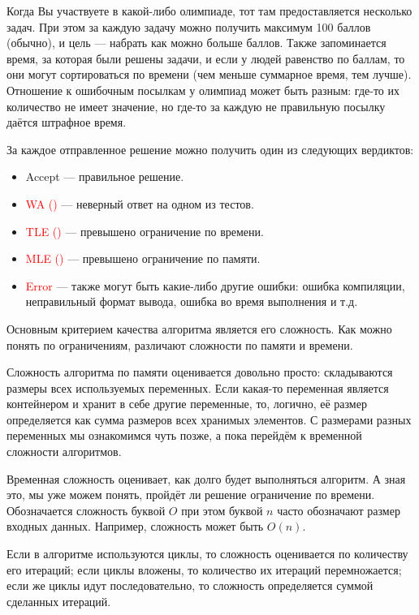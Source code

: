 Когда Вы участвуете в какой-либо олимпиаде, тот там предоставляется несколько задач. При этом за каждую задачу можно получить максимум 100 баллов (обычно), и цель — набрать как можно больше баллов. Также запоминается время, за которая были решены задачи, и если у людей равенство по баллам, то они могут сортироваться по времени (чем меньше суммарное время, тем лучше). Отношение к ошибочным посылкам у олимпиад может быть разным: где-то их количество не имеет значение, но где-то за каждую не правильную посылку даётся штрафное время.

За каждое отправленное решение можно получить один из следующих вердиктов:
\begin{itemize}
    \item \textcolor{dark_green}{Accept} — правильное решение.
    \item \textcolor{red}{WA ()} — неверный ответ на одном из тестов.
    \item \textcolor{red}{TLE ()} — превышено ограничение по времени.
    \item \textcolor{red}{MLE ()} — превышено ограничение по памяти.
    \item \textcolor{red}{Error} — также могут быть какие-либо другие ошибки: ошибка компиляции, неправильный формат вывода, ошибка во время выполнения и т.д.
\end{itemize}

Основным критерием качества алгоритма является его сложность. Как можно понять по ограничениям, различают сложности по памяти и времени.

Сложность алгоритма по памяти оценивается довольно просто: складываются размеры всех используемых переменных. Если какая-то переменная является контейнером и хранит в себе другие переменные, то, логично, её размер определяется как сумма размеров всех хранимых элементов. С размерами разных переменных мы ознакомимся чуть позже, а пока перейдём к временной сложности алгоритмов.

Временная сложность оценивает, как долго будет выполняться алгоритм. А зная это, мы уже можем понять, пройдёт ли решение ограничение по времени. Обозначается сложность буквой $O$ при этом буквой $n$ часто обозначают размер входных данных. Например, сложность может быть $O(n)$.

Если в алгоритме используются циклы, то сложность оценивается по количеству его итераций; если циклы вложены, то количество их итераций перемножается; если же циклы идут последовательно, то сложность определяется суммой сделанных итераций.

